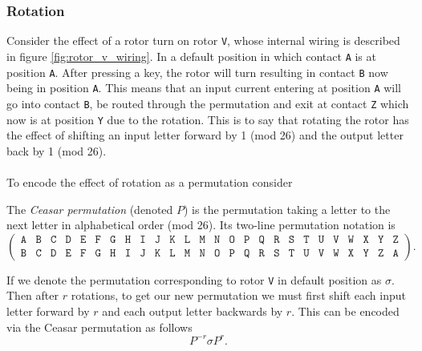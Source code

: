 \subsubsection{Rotation}

Consider the effect of a rotor turn on rotor \texttt{V}, whose
internal wiring is described in figure \ref{fig:rotor_v_wiring}.
In a default position in which contact \texttt{A} is at position
\texttt{A}. After pressing a key, the rotor
will turn resulting in contact \texttt{B} now being in position
\texttt{A}. This means that an input current
entering at position \texttt{A} will go into contact \texttt{B}, be
routed through the permutation and exit at contact
\texttt{Z} which now is at position \texttt{Y} due to the rotation.
This is to say that rotating the rotor has the effect
of shifting an input letter forward by 1 (mod 26) and the output
letter back by 1 (mod 26).
\\\\To encode the effect of rotation as a permutation consider
\begin{definition}
	The \emph{Ceasar permutation} (denoted $P$) is the permutation
	taking a letter to the next letter in alphabetical order (mod 26).
	Its two-line permutation notation is
	\[
		\left(
		\begin{array}{llllllllllllllllllllllllll}
				\texttt{A} & \texttt{B} & \texttt{C} & \texttt{D} &
				\texttt{E} & \texttt{F} & \texttt{G} & \texttt{H} &
				\texttt{I} & \texttt{J} & \texttt{K} & \texttt{L} &
				\texttt{M} & \texttt{N} & \texttt{O} & \texttt{P} &
				\texttt{Q} & \texttt{R} & \texttt{S} & \texttt{T} &
				\texttt{U} & \texttt{V} & \texttt{W} & \texttt{X} &
				\texttt{Y} & \texttt{Z}                             \\
				\texttt{B} & \texttt{C} & \texttt{D} &
				\texttt{E} & \texttt{F} & \texttt{G} & \texttt{H} &
				\texttt{I} & \texttt{J} & \texttt{K} & \texttt{L} &
				\texttt{M} & \texttt{N} & \texttt{O} & \texttt{P} &
				\texttt{Q} & \texttt{R} & \texttt{S} & \texttt{T} &
				\texttt{U} & \texttt{V} & \texttt{W} & \texttt{X} &
				\texttt{Y} & \texttt{Z} & \texttt{A}
			\end{array}
		\right).
	\]
\end{definition}
If we denote the permutation corresponding to rotor \texttt{V} in
default position as $\sigma$. Then after $r$ rotations, to get
our new permutation we must first shift each input letter forward by
$r$ and each output letter backwards by $r$. This can be encoded via
the Ceasar permutation as follows
\[
	{P^{-r}}\sigma{P^{r}}.
\]

